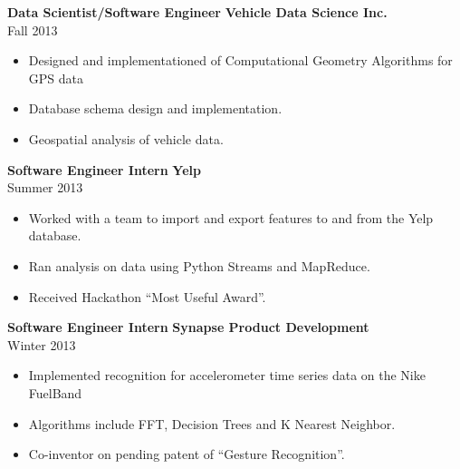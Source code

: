 \documentclass[9pt]{article}
\newenvironment{changemargin}[2]{%
  \begin{list}{}{%
    \setlength{\topsep}{0pt}%
    \setlength{\leftmargin}{#1}%
    \setlength{\rightmargin}{#2}%
    \setlength{\listparindent}{\parindent}%
    \setlength{\itemindent}{\parindent}%
    \setlength{\parsep}{\parskip}%
  }%
  \item[]}{\end{list}
}
\newenvironment{body} {
    \vspace*{-16pt}
    \begin{changemargin}{-0.20in}{-0.5in}
  }
    {\end{changemargin}
}
\begin{document}
\begin{body}
    \vspace{18pt}

    \textbf{Data Scientist/Software Engineer}
    \hfill
    \textbf{Vehicle Data Science Inc.} \\
    \hfill
    {\small Fall 2013} \\
    \vspace*{-14pt}
    \begin{itemize} %
        \item Designed and implementationed of Computational Geometry Algorithms for GPS data
        \item Database schema design and implementation.
        \item Geospatial analysis of vehicle data.
    \end{itemize}

    \textbf{Software Engineer Intern}
    \hfill
    \textbf{Yelp}\\
    \hfill
    {\small Summer 2013}\\

    \vspace*{-14pt}
    \begin{itemize} %
        \item Worked with a team to import and export features to and from the Yelp database.
        \item Ran analysis on data using Python Streams and MapReduce.
        \item Received Hackathon “Most Useful Award”.
    \end{itemize}

    \textbf{Software Engineer Intern}
    \hfill
    \textbf{Synapse Product Development}\\
    \hfill
    {\small Winter 2013}\\
    \vspace*{-14pt}
    \begin{itemize} %
        \item Implemented recognition for accelerometer time series data on the Nike FuelBand
        \item Algorithms include FFT, Decision Trees and K Nearest Neighbor.
        \item Co-inventor on pending patent of ``Gesture Recognition''.
    \end{itemize}


\end{body}
\end{document}
